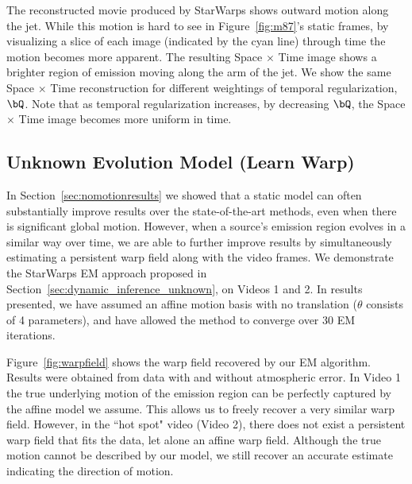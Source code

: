 The reconstructed movie produced by StarWarps shows outward motion along the jet. While this motion is hard to see in Figure~\ref{fig:m87}'s static frames, by visualizing a slice of each image (indicated by the cyan line) through time the motion becomes more apparent. The resulting Space $\times$ Time image shows a brighter region of emission moving along the arm of the jet. We show the same Space $\times$ Time reconstruction for different weightings of temporal regularization, $\bQ$. Note that as temporal regularization increases, by decreasing $\bQ$, the Space $\times$ Time image becomes more uniform in time. 
 
\vspace{-.2in}
\subsection{Unknown Evolution  Model (Learn Warp)}




In Section~\ref{sec:nomotionresults} we showed that a static model can often substantially improve results over the state-of-the-art methods, even when there is significant global motion. However, when a source's emission region evolves in a similar way over time, we are able to further improve results by simultaneously estimating a persistent warp field along with the video frames.
We demonstrate the StarWarps EM approach proposed in Section~\ref{sec:dynamic_inference_unknown}, on Videos 1 and 2. In results presented, we have assumed an affine motion basis with no translation ($\theta$ consists of 4 parameters), and have allowed the method to converge over 30 EM iterations. %

Figure~\ref{fig:warpfield} shows the warp field recovered by our EM algorithm. 
Results were obtained from data with and without atmospheric error. In Video 1 the true underlying motion of the emission region can be perfectly captured by the affine model we assume. This allows us to freely recover a very similar warp field. 
However, in the ``hot spot" video (Video 2), there does not exist a persistent warp field that fits the data, let alone an affine warp field. Although the true motion cannot be described by our model, we still recover an accurate estimate indicating the direction of motion. 


